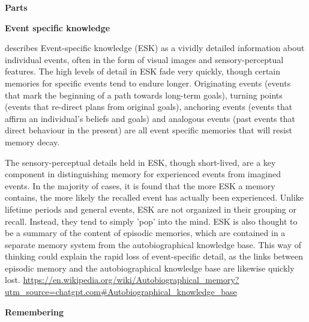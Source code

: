 \documentclass{book}
\providecommand{\ProjectDeepHeading}[2]{%
    \par\medskip\noindent\textbf{#2}\par\smallskip
}
\begin{document}
\ProjectDeepHeading{13}{Parts}

\ProjectDeepHeading{14}{Event specific knowledge}


\cite{pillemer-2001-momentous-events-and-the-life-story} describes Event-specific knowledge (ESK) as a vividly detailed information about individual events, often in the form of visual images and sensory-perceptual features. The high levels of detail in ESK fade very quickly, though certain memories for specific events tend to endure longer. Originating events (events that mark the beginning of a path towards long-term goals), turning points (events that re-direct plans from original goals), anchoring events (events that affirm an individual's beliefs and goals) and analogous events (past events that direct behaviour in the present) are all event specific memories that will resist memory decay.
    
    The sensory-perceptual details held in ESK, though short-lived, are a key component in distinguishing memory for experienced events from imagined events. In the majority of cases, it is found that the more ESK a memory contains, the more likely the recalled event has actually been experienced. Unlike lifetime periods and general events, ESK are not organized in their grouping or recall. Instead, they tend to simply 'pop' into the mind. ESK is also thought to be a summary of the content of episodic memories, which are contained in a separate memory system from the autobiographical knowledge base. This way of thinking could explain the rapid loss of event-specific detail, as the links between episodic memory and the autobiographical knowledge base are likewise quickly lost.
    \url{https://en.wikipedia.org/wiki/Autobiographical_memory?utm_source=chatgpt.com\#Autobiographical_knowledge_base}

\ProjectDeepHeading{15}{Remembering}

\end{document}
